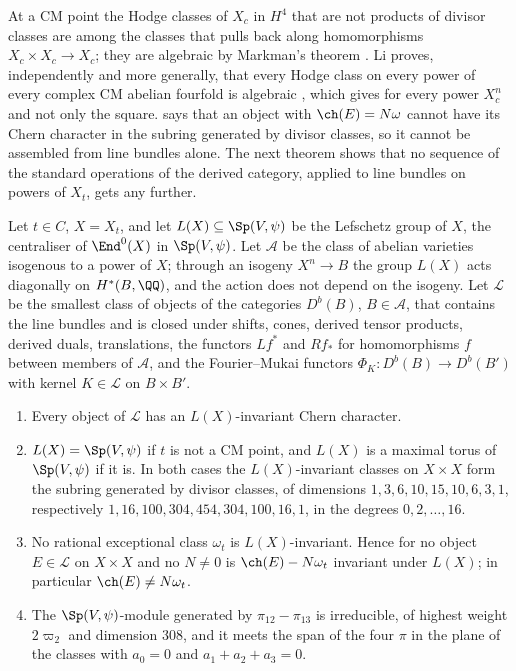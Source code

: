 At a CM point the Hodge classes of $X_{c}$ in $H^{4}$ that are not products
of divisor classes are among the classes that  pulls back
along homomorphisms $X_{c}\times X_{c}\to X_{c}$; they are algebraic by
Markman's theorem \cite{Mar25a}. Li proves,
independently and more generally, that every Hodge class on every power of
every complex CM abelian fourfold is algebraic \cite[Theorem~1.3]{Li26},
which gives  for every power $X_{c}^{n}$ and not only the
square.  says that an object with $\ch(E)=N\omega$
cannot have its Chern character in the subring generated by divisor classes,
so it cannot be assembled from line bundles alone. The next theorem shows that
no sequence of the standard operations of the derived category, applied to
line bundles on powers of $X_{t}$, gets any further.

\begin{theorem}\label{thm:lefschetzclosure}
Let $t\in C$, $X=X_{t}$, and let $L(X)\subseteq\Sp(V,\psi)$ be the Lefschetz
group of $X$, the centraliser of $\End^{0}(X)$ in $\Sp(V,\psi)$. Let
$\mathcal{A}$ be the class of abelian varieties isogenous to a power of $X$;
through an isogeny $X^{n}\to B$ the group $L(X)$ acts diagonally on
$H^{*}(B,\QQ)$, and the action does not depend on the isogeny. Let
$\mathcal{L}$ be the smallest class of objects of the categories
$D^{b}(B)$, $B\in\mathcal{A}$, that contains the line bundles and is closed
under shifts, cones, derived tensor products, derived duals, translations,
the functors $Lf^{*}$ and $Rf_{*}$ for homomorphisms $f$ between members of
$\mathcal{A}$, and the Fourier--Mukai functors $\Phi_{K}\colon D^{b}(B)\to
D^{b}(B')$ with kernel $K\in\mathcal{L}$ on $B\times B'$.
\begin{enumerate}[label=\textup{(\roman*)},leftmargin=2.6em,itemsep=2pt]
\item Every object of $\mathcal{L}$ has an $L(X)$-invariant Chern character.
\item $L(X)=\Sp(V,\psi)$ if $t$ is not a CM point, and $L(X)$ is a maximal
  torus of $\Sp(V,\psi)$ if it is. In both cases the $L(X)$-invariant classes
  on $X\times X$ form the subring generated by divisor classes, of dimensions
  $1,3,6,10,15,10,6,3,1$, respectively $1,16,100,304,454,304,100,16,1$, in
  the degrees $0,2,\dots,16$.
\item No rational exceptional class $\omega_{t}$ is $L(X)$-invariant. Hence
  for no object $E\in\mathcal{L}$ on $X\times X$ and no $N\ne0$ is
  $\ch(E)-N\omega_{t}$ invariant under $L(X)$; in particular
  $\ch(E)\ne N\omega_{t}$.
\item The $\Sp(V,\psi)$-module generated by $\pi_{12}-\pi_{13}$ is
  irreducible, of highest weight $2\varpi_{2}$ and dimension $308$, and it
  meets the span of the four $\pi$ in the plane of the classes with
  $a_{0}=0$ and $a_{1}+a_{2}+a_{3}=0$.
\end{enumerate}
\end{theorem}

